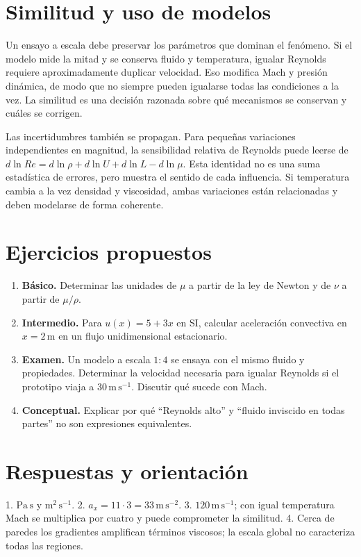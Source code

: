 \section{Similitud y uso de modelos}
Un ensayo a escala debe preservar los parámetros que dominan el fenómeno. Si el modelo mide la mitad y se conserva fluido y temperatura, igualar Reynolds requiere aproximadamente duplicar velocidad. Eso modifica Mach y presión dinámica, de modo que no siempre pueden igualarse todas las condiciones a la vez. La similitud es una decisión razonada sobre qué mecanismos se conservan y cuáles se corrigen.

Las incertidumbres también se propagan. Para pequeñas variaciones independientes en magnitud, la sensibilidad relativa de Reynolds puede leerse de $d\ln Re=d\ln\rho+d\ln U+d\ln L-d\ln\mu$. Esta identidad no es una suma estadística de errores, pero muestra el sentido de cada influencia. Si temperatura cambia a la vez densidad y viscosidad, ambas variaciones están relacionadas y deben modelarse de forma coherente.

\section{Ejercicios propuestos}
\begin{enumerate}
\item \textbf{Básico.} Determinar las unidades de $\mu$ a partir de la ley de Newton y de $\nu$ a partir de $\mu/\rho$.
\item \textbf{Intermedio.} Para $u(x)=5+3x$ en SI, calcular aceleración convectiva en $x=2\,\mathrm{m}$ en un flujo unidimensional estacionario.
\item \textbf{Examen.} Un modelo a escala $1{:}4$ se ensaya con el mismo fluido y propiedades. Determinar la velocidad necesaria para igualar Reynolds si el prototipo viaja a $30\,\mathrm{m\,s^{-1}}$. Discutir qué sucede con Mach.
\item \textbf{Conceptual.} Explicar por qué ``Reynolds alto'' y ``fluido inviscido en todas partes'' no son expresiones equivalentes.
\end{enumerate}
\section{Respuestas y orientación}
1. $\mathrm{Pa\,s}$ y $\mathrm{m^2\,s^{-1}}$. 2. $a_x=11\cdot3=33\,\mathrm{m\,s^{-2}}$. 3. $120\,\mathrm{m\,s^{-1}}$; con igual temperatura Mach se multiplica por cuatro y puede comprometer la similitud. 4. Cerca de paredes los gradientes amplifican términos viscosos; la escala global no caracteriza todas las regiones.

